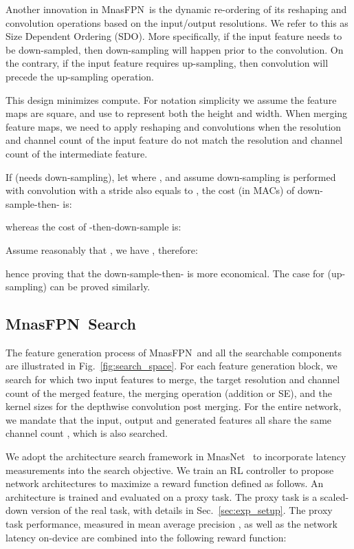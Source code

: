 \documentclass[10pt,twocolumn,letterpaper]{article}
\def\Mnasfpn{MnasFPN~}
\begin{document}
Another innovation in \Mnasfpn is the dynamic re-ordering of its reshaping and convolution operations based on the input/output resolutions. We refer to this as Size Dependent Ordering (SDO). More specifically, if the input feature needs to be down-sampled, then down-sampling will happen prior to the  convolution. On the contrary, if the input feature requires up-sampling, then  convolution will precede the up-sampling operation. 

This design minimizes compute. For notation simplicity we assume the feature maps are square, and use  to represent both the height and width. When merging feature maps, we need to apply reshaping and  convolutions when the resolution  and channel count  of the input feature do not match the resolution  and channel count  of the intermediate feature. 

If  (needs down-sampling), let  where , and assume down-sampling is performed with  convolution with a stride also equals to , the cost (in MACs) of down-sample-then- is:

whereas the cost of -then-down-sample is:


Assume reasonably that , we have , therefore:

hence proving that the down-sample-then- is more economical. The case for  (up-sampling) can be proved similarly. 




\subsection{\Mnasfpn Search}
\label{sec:search_space}





The feature generation process of \Mnasfpn and all the searchable components are illustrated in Fig.~\ref{fig:search_space}. For each feature generation block, we search for which two input features to merge, the target resolution  and channel count  of the merged feature, the merging operation (addition or SE), and the kernel sizes for the depthwise convolution post merging. For the entire network, we mandate that the input, output and generated features all share the same channel count , which is also searched. 


We adopt the architecture search framework in MnasNet~\cite{tan2019mnasnet} to incorporate latency measurements into the search objective. We train an RL controller to propose network architectures to maximize a reward function defined as follows. An architecture  is trained and evaluated on a proxy task. The proxy task is a scaled-down version of the real task, with details in Sec.~\ref{sec:exp_setup}. The proxy task performance, measured in mean average precision , as well as the network latency on-device  are combined into the following reward function:
\end{document}
